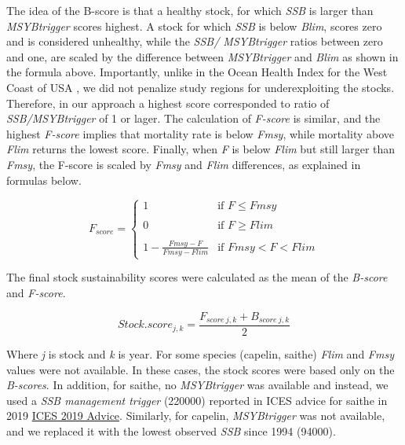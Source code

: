 \documentclass[
]{book}
\begin{document}
The idea of the B-score is that a healthy stock, for which \emph{SSB} is larger than \emph{MSYBtrigger} scores highest. A stock for which \emph{SSB} is below \emph{Blim}, scores zero and is considered unhealthy, while the \emph{SSB/ MSYBtrigger} ratios between zero and one, are scaled by the difference between \emph{MSYBtrigger} and \emph{Blim} as shown in the formula above. Importantly, unlike in the Ocean Health Index for the West Coast of USA \citep{halpern2014assessing}, we did not penalize study regions for underexploiting the stocks. Therefore, in our approach a highest score corresponded to ratio of \emph{SSB/MSYBtrigger} of 1 or lager.
The calculation of \emph{F-score} is similar, and the highest \emph{F-score} implies that mortality rate is below \emph{Fmsy}, while mortality above \emph{Flim} returns the lowest score. Finally, when \emph{F} is below \emph{Flim} but still larger than \emph{Fmsy}, the F-score is scaled by \emph{Fmsy} and \emph{Flim} differences, as explained in formulas below.

\begin{equation}
  F_{score} =
    \begin{cases}
      1 & \text{if $F \le Fmsy$}\\
    \\  
      0 & \text{if $F \ge Flim $}\\
      \\
      1 - \frac{Fmsy - F}{Fmsy - Flim} & \text{if $Fmsy < F < Flim $}
 \label{eq:fscore}       
    \end{cases}  
\end{equation}

The final stock sustainability scores were calculated as the mean of the \emph{B-score} and \emph{F-score}.

\begin{equation}
Stock.score_{j,k} = \frac{F_{score\ j,k} +B_{score\ j,k}}{2}
 \label{eq:sscore} 
\end{equation}

Where \emph{j} is stock and \emph{k} is year.
For some species (capelin, saithe) \emph{Flim} and \emph{Fmsy} values were not available. In these cases, the stock scores were based only on the \emph{B-scores}. In addition, for saithe, no \emph{MSYBtrigger} was available and instead, we used a \emph{SSB management trigger} (220000) reported in ICES advice for saithe in 2019 \href{http://ices.dk/sites/pub/Publication\%20Reports/Advice/2019/2019/pok.27.1-2.pdf}{ICES 2019 Advice}. Similarly, for capelin, \emph{MSYBtrigger} was not available, and we replaced it with the lowest observed \emph{SSB} since 1994 (94000).
\end{document}

